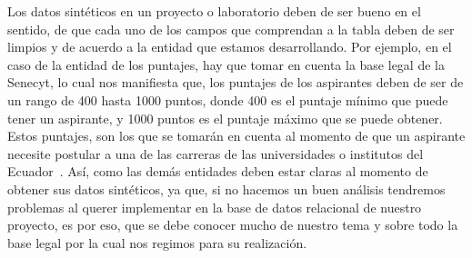 \documentclass[10pt, oneside,spanish]{article}   	%
\begin{document}
Los datos sintéticos en un proyecto o laboratorio deben de ser bueno en el sentido, de que cada uno de los campos que comprendan a la tabla deben de ser limpios y de acuerdo a la entidad que estamos desarrollando. Por ejemplo, en el caso de la entidad de los puntajes, hay que tomar en cuenta la base legal de la Senecyt, lo cual nos manifiesta que, los puntajes de los aspirantes deben de ser de un rango de 400 hasta 1000 puntos, donde 400 es el puntaje mínimo que puede tener un aspirante, y 1000 puntos es el puntaje máximo que se puede obtener. Estos puntajes, son los que se tomarán en cuenta al momento de que un aspirante necesite postular a una de las carreras de las universidades o institutos del Ecuador~\cite{jurado}. Así, como las demás entidades deben estar claras al momento de obtener sus datos sintéticos, ya que, si no hacemos un buen análisis tendremos problemas al querer implementar en la base de datos relacional de nuestro proyecto, es por eso, que se debe conocer mucho de nuestro tema y sobre todo la base legal por la cual nos regimos para su realización. 
\end{document}
